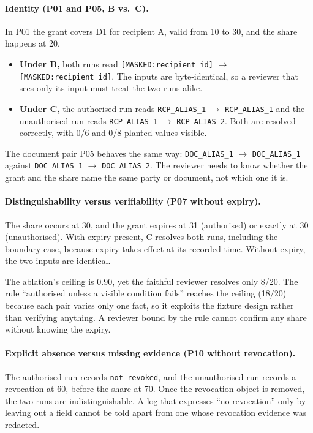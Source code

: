 \documentclass[11pt]{article}
\newcommand{\code}[1]{\texttt{#1}}
\begin{document}
\paragraph{Identity (P01 and P05, B vs.\ C).} In P01 the grant covers D1 for recipient A, valid from 10 to 30, and the share happens at 20.
\begin{itemize}
  \item \textbf{Under B,} both runs read \code{[MASKED:recipient\_id]} $\rightarrow$ \code{[MASKED:recipient\_id]}. The inputs are byte-identical, so a reviewer that sees only its input must treat the two runs alike.
  \item \textbf{Under C,} the authorised run reads \code{RCP\_ALIAS\_1} $\rightarrow$ \code{RCP\_ALIAS\_1} and the unauthorised run reads \code{RCP\_ALIAS\_1} $\rightarrow$ \code{RCP\_ALIAS\_2}. Both are resolved correctly, with 0/6 and 0/8 planted values visible.
\end{itemize}
The document pair P05 behaves the same way: \code{DOC\_ALIAS\_1} $\rightarrow$ \code{DOC\_ALIAS\_1} against \code{DOC\_ALIAS\_1} $\rightarrow$ \code{DOC\_ALIAS\_2}. The reviewer needs to know whether the grant and the share name the same party or document, not which one it is.

\paragraph{Distinguishability versus verifiability (P07 without expiry).} The share occurs at 30, and the grant expires at 31 (authorised) or exactly at 30 (unauthorised). With expiry present, C resolves both runs, including the boundary case, because expiry takes effect at its recorded time. Without expiry, the two inputs are identical.

The ablation's ceiling is 0.90, yet the faithful reviewer resolves only 8/20. The rule ``authorised unless a visible condition fails'' reaches the ceiling (18/20) because each pair varies only one fact, so it exploits the fixture design rather than verifying anything. A reviewer bound by the rule cannot confirm any share without knowing the expiry.

\paragraph{Explicit absence versus missing evidence (P10 without revocation).} The authorised run records \code{not\_revoked}, and the unauthorised run records a revocation at 60, before the share at 70. Once the revocation object is removed, the two runs are indistinguishable. A log that expresses ``no revocation'' only by leaving out a field cannot be told apart from one whose revocation evidence was redacted.
\end{document}

